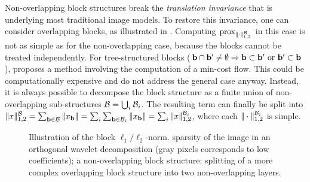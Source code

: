Non-overlapping block structures break the \textit{translation invariance} that is underlying most traditional image models. To restore this invariance, one can consider overlapping blocks, as illustrated in . Computing $\operatorname{prox}_{|\kern-1pt| \cdot |\kern-1pt|_{1,2}^{\mathcal{B}}}$ in this case is not as simple as for the non-overlapping case, because the blocks cannot be treated independently. For tree-structured blocks (\ie $\mathbf{b} \cap \mathbf{b}^{\prime} \neq \emptyset \Rightarrow \mathbf{b} \subset \mathbf{b}^{\prime} ~\text{or}~ \mathbf{b}^{\prime} \subset \mathbf{b}$), \cite{Jenatton10} proposes a method involving the computation of a min-cost flow. This could be computationally expensive and do not address the general case anyway. Instead, it is always possible to decompose the block structure as a finite union of non-overlapping sub-structures $\mathcal{B} = \bigcup_{i} \mathcal{B}_i$. The resulting term can finally be split into $|\kern-1pt| x |\kern-1pt|_{1,2}^{\mathcal{B}} = \sum_{\mathbf{b} \in \mathcal{B}} |\kern-1pt| x_{\mathbf{b}} |\kern-1pt| = \sum_i \sum_{\mathbf{b} \in \mathcal{B}_i} |\kern-1pt| x_{\mathbf{b}} |\kern-1pt| = \sum_i |\kern-1pt| x |\kern-1pt|_{1,2}^{\mathcal{B}_i}$, where each $|\kern-1pt| \cdot |\kern-1pt|_{1,2}^{\mathcal{B}_i}$ is simple.

\begin{figure}[!ht]
\bigcenter
{}
\caption{Illustration of the block $\ell_1/\ell_2$-norm.  sparsity of the image in an orthogonal wavelet decomposition (gray pixels corresponds to low coefficients);  a non-overlapping block structure;  splitting of a more complex overlapping block structure into two non-overlapping layers.}
\label{fig:blocks}
\end{figure}

